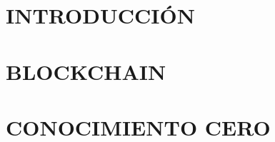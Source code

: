 \documentclass[12pt, oneside]{book}
\begin{document}
\frontmatter



\newpage
\thispagestyle{empty}
\null
\clearpage 
	
\newpage
\setcounter{page}{1}


\newpage




%

\newpage


\newpage


\newpage


\newpage



\newpage
\tableofcontents

\newpage
\listoffigures
 
\newpage
\listoftables

\newpage



\mainmatter
\chapterformatdefault

\chapter{INTRODUCCIÓN}
\thispagestyle{empty}


\chapter{BLOCKCHAIN}
\thispagestyle{empty}





\chapter{CONOCIMIENTO CERO}





\end{document}
